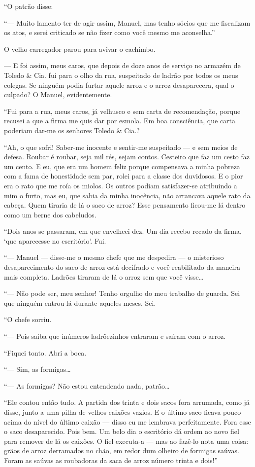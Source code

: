 ``O patrão disse:

``--- Muito lamento ter de agir assim, Manuel, mas tenho sócios que me
fiscalizam os atos, e serei criticado se não fizer como você mesmo me
aconselha.''

O velho carregador parou para avivar o cachimbo.

--- E foi assim, meus caros, que depois de doze anos de serviço no
armazém de Toledo \& Cia. fui para o olho da rua, suspeitado de ladrão
por todos os meus colegas. Se ninguém podia furtar aquele arroz e o
arroz desaparecera, qual o culpado? O Manuel, evidentemente.

``Fui para a rua, meus caros, já velhusco e sem carta de recomendação,
porque recusei a que a firma me quis dar por esmola. Em boa consciência,
que carta poderiam dar-me os senhores Toledo \& Cia.?

``Ah, o que sofri! Saber-me inocente e sentir-me suspeitado --- e sem
meios de defesa. Roubar é roubar, seja mil rés, sejam contos. Cesteiro
que faz um cesto faz um cento. E eu, que era um homem feliz porque
compensava a minha pobreza com a fama de honestidade sem par, rolei para
a classe dos duvidosos. E o pior era o rato que me roía os miolos. Os
outros podiam satisfazer-se atribuindo a mim o furto, mas eu, que sabia
da minha inocência, não arrancava aquele rato da cabeça. Quem tiraria de
lá o saco de arroz? Esse pensamento ficou-me lá dentro como um berne dos
cabeludos.

``Dois anos se passaram, em que envelheci dez. Um dia recebo recado da
firma, `que aparecesse no escritório'. Fui.

``--- Manuel --- disse-me o mesmo chefe que me despedira --- o
misterioso desaparecimento do saco de arroz está decifrado e você
reabilitado da maneira mais completa. Ladrões tiraram de lá o arroz sem
que você visse\ldots{}

``--- Não pode ser, meu senhor! Tenho orgulho do meu trabalho de guarda.
Sei que ninguém entrou lá durante aqueles meses. Sei.

``O chefe sorriu.

``--- Pois saiba que inúmeros ladrõezinhos entraram e saíram com o
arroz.

``Fiquei tonto. Abri a boca.

``--- Sim, as formigas\ldots{}

``--- As formigas? Não estou entendendo nada, patrão\ldots{}

``Ele contou então tudo. A partida dos trinta e dois sacos fora
arrumada, como já disse, junto a uma pilha de velhos caixões vazios. E o
último saco ficava pouco acima do nível do último caixão --- disso eu me
lembrava perfeitamente. Fora esse o saco desaparecido. Pois bem. Um belo
dia o escritório dá ordem ao novo fiel para remover de lá os caixões. O
fiel executa-a --- mas ao fazê-lo nota uma coisa: grãos de arroz
derramados no chão, em redor dum olheiro de formigas saúvas. Foram as
saúvas as roubadoras da saca de arroz número trinta e dois!''

